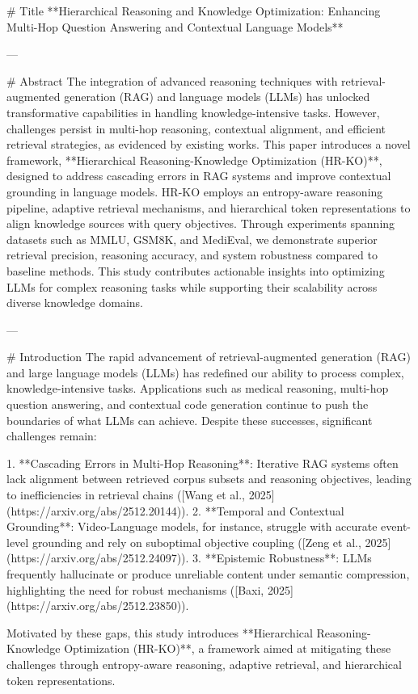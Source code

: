 # Title  
**Hierarchical Reasoning and Knowledge Optimization: Enhancing Multi-Hop Question Answering and Contextual Language Models**

---

# Abstract  
The integration of advanced reasoning techniques with retrieval-augmented generation (RAG) and language models (LLMs) has unlocked transformative capabilities in handling knowledge-intensive tasks. However, challenges persist in multi-hop reasoning, contextual alignment, and efficient retrieval strategies, as evidenced by existing works. This paper introduces a novel framework, **Hierarchical Reasoning-Knowledge Optimization (HR-KO)**, designed to address cascading errors in RAG systems and improve contextual grounding in language models. HR-KO employs an entropy-aware reasoning pipeline, adaptive retrieval mechanisms, and hierarchical token representations to align knowledge sources with query objectives. Through experiments spanning datasets such as MMLU, GSM8K, and MediEval, we demonstrate superior retrieval precision, reasoning accuracy, and system robustness compared to baseline methods. This study contributes actionable insights into optimizing LLMs for complex reasoning tasks while supporting their scalability across diverse knowledge domains.

---

# Introduction  
The rapid advancement of retrieval-augmented generation (RAG) and large language models (LLMs) has redefined our ability to process complex, knowledge-intensive tasks. Applications such as medical reasoning, multi-hop question answering, and contextual code generation continue to push the boundaries of what LLMs can achieve. Despite these successes, significant challenges remain:

1. **Cascading Errors in Multi-Hop Reasoning**: Iterative RAG systems often lack alignment between retrieved corpus subsets and reasoning objectives, leading to inefficiencies in retrieval chains ([Wang et al., 2025](https://arxiv.org/abs/2512.20144)).
2. **Temporal and Contextual Grounding**: Video-Language models, for instance, struggle with accurate event-level grounding and rely on suboptimal objective coupling ([Zeng et al., 2025](https://arxiv.org/abs/2512.24097)).
3. **Epistemic Robustness**: LLMs frequently hallucinate or produce unreliable content under semantic compression, highlighting the need for robust mechanisms ([Baxi, 2025](https://arxiv.org/abs/2512.23850)).

Motivated by these gaps, this study introduces **Hierarchical Reasoning-Knowledge Optimization (HR-KO)**, a framework aimed at mitigating these challenges through entropy-aware reasoning, adaptive retrieval, and hierarchical token representations.

